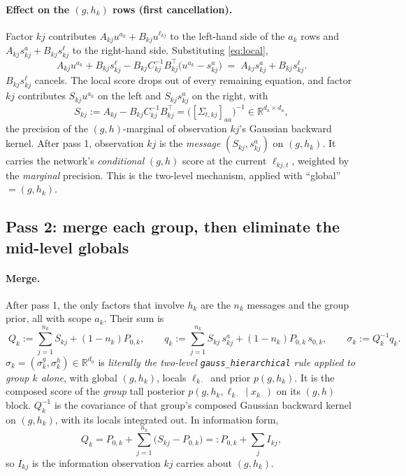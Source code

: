 \documentclass[11pt]{article}
\theoremstyle{definition}
\theoremstyle{remark}
\newcommand{\R}{\mathbb{R}}
\newcommand{\T}{\top}
\newcommand{\arrowm}{\texttt{gauss\_\allowbreak hierarchical}}
\newcommand{\hk}{h_k}
\newcommand{\lkj}{\ell_{kj}}
\newcommand{\ak}{a_k}          %
\begin{document}
\paragraph{Effect on the $(g,\hk)$ rows (first cancellation).} Factor $kj$
contributes $A_{kj}u^{\ak}+B_{kj}u^{\lkj}$ to the left-hand side of the $\ak$ rows
and $A_{kj}s^a_{kj}+B_{kj}s^\ell_{kj}$ to the right-hand side. Substituting
\eqref{eq:local},
\[
A_{kj}u^{\ak}+B_{kj}s^\ell_{kj}-B_{kj}C_{kj}^{-1}B_{kj}^\T\big(u^{\ak}-s^a_{kj}\big)
\;=\;A_{kj}s^a_{kj}+B_{kj}s^\ell_{kj}.
\]
$B_{kj}s^\ell_{kj}$ cancels. The local score drops out of every remaining
equation, and factor $kj$ contributes $S_{kj}u^{\ak}$ on the left and
$S_{kj}s^a_{kj}$ on the right, with
\begin{equation}\label{eq:Skj}
S_{kj}:=A_{kj}-B_{kj}C_{kj}^{-1}B_{kj}^\T=\big([\Sigma_{t,kj}]_{aa}\big)^{-1}\in\R^{d_a\times d_a},
\end{equation}
the precision of the $(g,h)$-marginal of observation $kj$'s Gaussian backward
kernel. After pass 1, observation $kj$ is the \emph{message} $(S_{kj},s^a_{kj})$ on
$(g,\hk)$. It carries the network's \emph{conditional} $(g,h)$ score at the
current $\ell_{kj,t}$, weighted by the \emph{marginal} precision. This is the
two-level mechanism, applied with ``global'' $=(g,\hk)$.

\subsection{Pass 2: merge each group, then eliminate the mid-level globals}

\paragraph{Merge.} After pass 1, the only factors that involve $\hk$ are the
$n_k$ messages and the group prior, all with scope $\ak$. Their sum is
\begin{equation}\label{eq:merge}
\boxed{\;
Q_k:=\sum_{j=1}^{n_k}S_{kj}+(1-n_k)P_{0,k},\qquad
q_k:=\sum_{j=1}^{n_k}S_{kj}\,s^a_{kj}+(1-n_k)P_{0,k}\,s_{0,k},\qquad
\sigma_k:=Q_k^{-1}q_k.\;}
\end{equation}
$\sigma_k=(\sigma^g_k,\sigma^h_k)\in\R^{d_a}$ is \emph{literally the two-level
\arrowm{} rule applied to group $k$ alone}, with global $(g,\hk)$, locals
$\ell_{k\cdot}$ and prior $p(g,\hk)$. It is the composed score of the
\emph{group} tall posterior $p(g,\hk,\ell_{k\cdot}\mid x_{k\cdot})$ on its $(g,h)$
block. $Q_k^{-1}$ is the covariance of that group's composed Gaussian backward
kernel on $(g,\hk)$, with its locals integrated out. In information form,
\begin{equation}\label{eq:Qk-info}
Q_k=P_{0,k}+\sum_{j=1}^{n_k}\big(S_{kj}-P_{0,k}\big)=:P_{0,k}+\sum_jI_{kj},
\end{equation}
so $I_{kj}$ is the information observation $kj$ carries about $(g,\hk)$.
\end{document}
